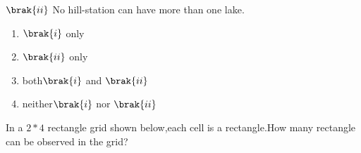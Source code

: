     $\brak{ii}$ No hill-station can have more than one lake.
    \begin{enumerate}
        \item $\brak{i}$ only\\
        \item$\brak{ii}$ only\\
        \item both$\brak{i}$ and $\brak{ii}$\\
        \item neither$\brak{i}$ nor $\brak{ii}$
    \end{enumerate}
    \item In a $2 * 4$ rectangle grid shown below,each cell is a rectangle.How many rectangle can be observed in the grid?\\   
    
